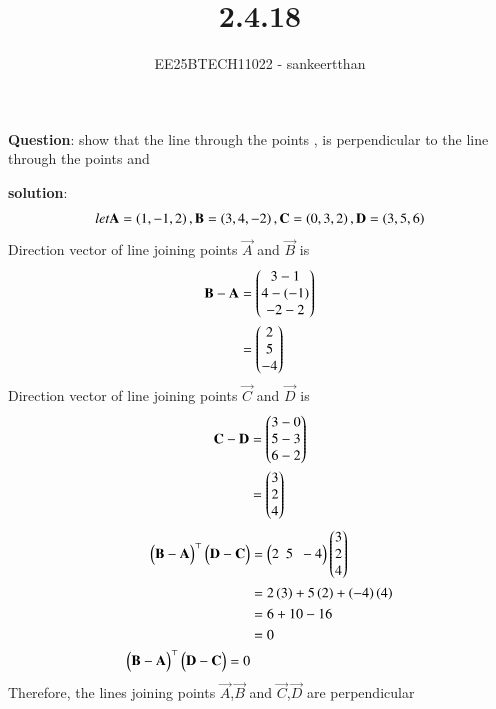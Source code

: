 \documentclass[journal]{IEEEtran}
\begin{document}


\title{2.4.18}
\author{EE25BTECH11022 - sankeertthan}
{\let\newpage\relax\maketitle}

\renewcommand{\thefigure}{\theenumi}
\renewcommand{\thetable}{\theenumi}
\setlength{\intextsep}{10pt} %


\textbf{Question}: show that the line through the points  ,  is perpendicular to the line through the  points   and 

\textbf{solution}:
\begin{align}
let \Vec{A} =\brak{1,-1,2},\Vec{B} =\brak{3,4,-2},\Vec{C} =\brak{0,3,2},\Vec{D} =\brak{3,5,6}
\end{align}
Direction vector of line joining points $\Vec{A}$ and $\Vec{B}$ is
\begin{align}
    \Vec{B}-\Vec{A} &= \myvec{3-1 \\ 4-(-1) \\ -2-2}\\
    &= \myvec{2 \\ 5 \\-4}\\
\end{align}
Direction vector of line joining points $\Vec{C}$ and $\Vec{D}$ is
\begin{align}
    \Vec{C}-\Vec{D} &= \myvec{3-0 \\ 5-3 \\ 6-2}\\
    &= \myvec{3 \\ 2 \\4}\\
\end{align}
\begin{align}
\myvec{\vec{B}-\vec{A}}^\top\myvec{\vec{D}-\vec{C}} &= \myvec{2 \ \ 5 \ \ -4}\myvec{3 \\ 2 \\4}\\
 &= 2\brak{3}+5\brak{2}+\brak{-4}\brak{4}\\
 &=6+10-16\\
 &=0\\
 \myvec{\vec{B}-\vec{A}}^\top\myvec{\vec{D}-\vec{C}} = 0
\end{align}
Therefore, the lines joining points $\Vec{A}$,$\Vec{B}$ and $\Vec{C}$,$\Vec{D}$ are perpendicular 
\end{document}
